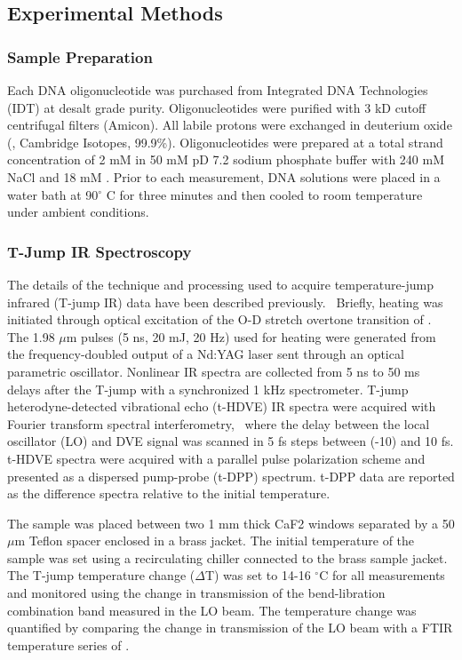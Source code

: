 \documentclass[journal=jpcbfk,manuscript=article]{achemso}
\begin{document}
\subsection{Experimental Methods}

\subsubsection{Sample Preparation}

Each DNA oligonucleotide was purchased from Integrated DNA Technologies (IDT) at desalt grade purity. Oligonucleotides were purified with 3 kD cutoff centrifugal filters (Amicon). All labile protons were exchanged in deuterium oxide (, Cambridge Isotopes, 99.9\%). Oligonucleotides were prepared at a total strand concentration of 2 mM in 50 mM pD 7.2 sodium phosphate buffer with 240 mM NaCl and 18 mM . Prior to each measurement, DNA solutions were placed in a water bath at 90$^{\circ}$ C for three minutes and then cooled to room temperature under ambient conditions.

\subsubsection{T-Jump IR Spectroscopy}\label{sec:Tjump}

The details of the technique and processing used to acquire temperature-jump infrared (T-jump IR) data have been described previously.~\citep{Chung2007TransientKinetics,Jones2009Heterodyne-detectedSpectroscopy,Jones2012TransientInfrared} Briefly, heating was initiated through optical excitation of the O-D stretch overtone transition of . The 1.98 $\mu$m pulses (5 ns, 20 mJ, 20 Hz) used for heating were generated from the frequency-doubled output of a Nd:YAG laser sent through an optical parametric oscillator. Nonlinear IR spectra are collected from 5 ns to 50 ms delays after the T-jump with a synchronized 1 kHz spectrometer. T-jump heterodyne-detected vibrational echo (t-HDVE) IR spectra were acquired with Fourier transform spectral interferometry,~\citep{Jones2009Heterodyne-detectedSpectroscopy} where the delay between the local oscillator (LO) and DVE signal was scanned in 5 fs steps between (-10) and 10 fs. t-HDVE spectra were acquired with a parallel pulse polarization scheme and presented as a dispersed pump-probe (t-DPP) spectrum. t-DPP data are reported as the difference spectra relative to the initial temperature. 

The sample was placed between two 1 mm thick CaF2 windows separated by a 50 $\mu$m Teflon spacer enclosed in a brass jacket. The initial temperature of the sample was set using a recirculating chiller connected to the brass sample jacket. The T-jump temperature change ($\Delta$T) was set to 14-16 $^\circ$C for all measurements and monitored using the change in transmission of the  bend-libration combination band measured in the LO beam. The temperature change was quantified by comparing the change in transmission of the LO beam with a FTIR temperature series of . 
\end{document}
